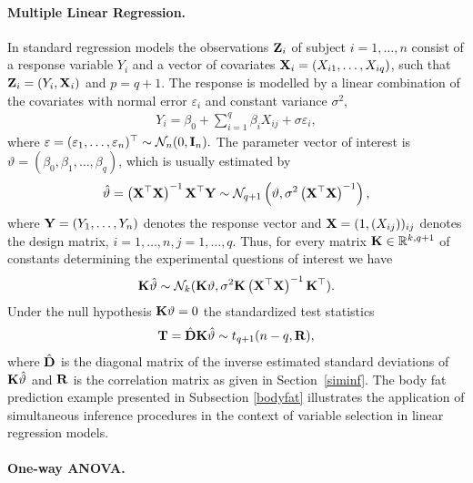 \documentclass[12pt]{article}
\begin{document}
\paragraph{Multiple Linear Regression.}

In standard regression models the observations $\mathbf{Z}_i$ of subject $i=1,
\ldots, n$ consist of a response variable $Y_i$ and a vector of covariates $%
\X_i = (X_{i1}, \dots, X_{iq})$, such that $\mathbf{Z}_i = (Y_i, \mathbf{X}_i)$ and $p = q +
1$. The response is modelled by a linear combination of the covariates with
normal error $\varepsilon_i$ and constant variance $\sigma^2$, 
\begin{eqnarray*}
Y_i = \beta_0 + \sum_{i = 1}^q \beta_i X_{ij} + \sigma \varepsilon_i,
\end{eqnarray*}
where $\varepsilon = (\varepsilon_1, \dots, \varepsilon_n)^\top \sim \mathcal{N}_n(0, 
\mathbf{I}_n).$ The parameter vector of interest is $\vartheta = (\beta_0,
\beta_1, \dots, \beta_q)$, which is usually estimated by 
\begin{eqnarray*}
\hat{\vartheta} = \left(\X^\top\X\right)^{-1} \X^\top \Y \sim \N%
_{q+1}\left(\vartheta, \sigma^2 \left(\X^\top\X\right)^{-1}\right),
\end{eqnarray*}
where $\mathbf{Y} = (Y_1, \dots, Y_n)$ denotes the response vector and $\mathbf{X}
= (1, (X_{ij}))_{ij}$ denotes the design matrix, $i = 1, \dots, n, j = 1,
\dots, q$. Thus, for every matrix $\mathbf{K} \in \mathbb{R}^{k,q+1}$ of constants
determining the experimental questions of interest we have 
\begin{eqnarray*}
\K \hat{\vartheta} \sim \N_k(\K \vartheta, \sigma^2 \K \left(\X^\top\X%
\right)^{-1} \K^\top).
\end{eqnarray*}
Under the null hypothesis $\mathbf{K} \vartheta = 0$ the standardized test
statistics 
\begin{eqnarray*}
\mathbf{T} = \hat{\mathbf{D}} \mathbf{K} \hat{\vartheta} \sim t_{q+1}(n - q, \mathbf{R}),
\end{eqnarray*}
where $\hat{\mathbf{D}}$ is the diagonal matrix of the inverse estimated standard
deviations of $\mathbf{K} \hat{\vartheta}$ and $\mathbf{R}$ is the correlation matrix as
given in Section~\ref{siminf}. The body fat prediction example presented in
Subsection \ref{bodyfat} illustrates the application of simultaneous
inference procedures in the context of variable selection in linear
regression models.

\paragraph{One-way ANOVA.}
\end{document}
